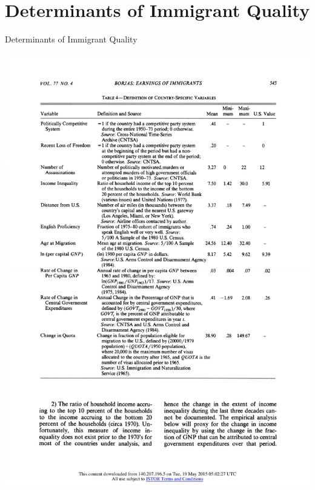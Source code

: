 \documentclass[10pt]{beamer}
\begin{document}
\section[Determinants]{Determinants of Immigrant Quality}
\begin{frame}[t]{Determinants of Immigrant Quality}
\centerline{\includegraphics[height=0.85\textheight]{CountrySpe.pdf}}
\end{frame}
\end{document}

